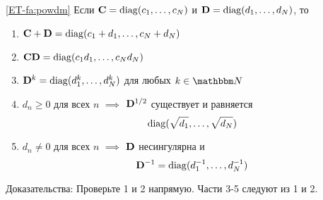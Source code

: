\begin{frame}
    
    \vspace{2em}
    \Fact\eqref{ET-fa:powdm} Если $\mathbf C = \operatorname{diag}(c_1, \ldots, c_N)$ и 
    $\mathbf D = \operatorname{diag}(d_1, \ldots, d_N)$, то
    \begin{enumerate}
        \item $\mathbf C + \mathbf D = \operatorname{diag}(c_1 + d_1, \ldots, c_N + d_N)$
            \vspace{0.4em}
        \item $\mathbf C \mathbf D = \operatorname{diag}(c_1 d_1, \ldots, c_N d_N)$
            \vspace{0.4em}
        \item $\mathbf D^k = \operatorname{diag}(d^k_1, \ldots, d^k_N)$ для любых $k \in \NN$
            \vspace{0.4em}
        \item $d_n \geq 0$ для всех $n$ $\implies$ $\mathbf D^{1/2}$ существует и равняется
            $$\operatorname{diag}(\sqrt{d_1}, \ldots, \sqrt{d_N})$$
            \vspace{-1.5em}
        \item $d_n \not= 0$ для всех $n$ $\implies$ $\mathbf D$ несингулярна и 
            $$\mathbf D^{-1} = \operatorname{diag}(d_1^{-1}, \ldots, d_N^{-1})$$
    \end{enumerate}

    Доказательства: Проверьте 1 и 2 напрямую. Части 3-5 следуют из 1 и 2. 

\end{frame}


